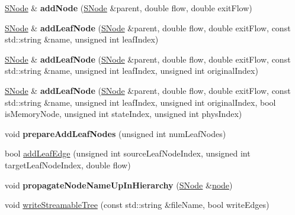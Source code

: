 \begin{DoxyCompactItemize}
\mbox{\hyperlink{classSNode}{S\+Node}} \& {\bfseries add\+Node} (\mbox{\hyperlink{classSNode}{S\+Node}} \&parent, double flow, double exit\+Flow)
\item 
\mbox{\label{classHierarchicalNetwork_a5aad30a822aacde199079cb03190194f}} 
\mbox{\hyperlink{classSNode}{S\+Node}} \& {\bfseries add\+Leaf\+Node} (\mbox{\hyperlink{classSNode}{S\+Node}} \&parent, double flow, double exit\+Flow, const std\+::string \&name, unsigned int leaf\+Index)
\item 
\mbox{\label{classHierarchicalNetwork_a276be851d34e1e2ffb1b12a314f9313a}} 
\mbox{\hyperlink{classSNode}{S\+Node}} \& {\bfseries add\+Leaf\+Node} (\mbox{\hyperlink{classSNode}{S\+Node}} \&parent, double flow, double exit\+Flow, const std\+::string \&name, unsigned int leaf\+Index, unsigned int original\+Index)
\item 
\mbox{\label{classHierarchicalNetwork_a1d9f53da720bd03750af0b747fd8eb70}} 
\mbox{\hyperlink{classSNode}{S\+Node}} \& {\bfseries add\+Leaf\+Node} (\mbox{\hyperlink{classSNode}{S\+Node}} \&parent, double flow, double exit\+Flow, const std\+::string \&name, unsigned int leaf\+Index, unsigned int original\+Index, bool is\+Memory\+Node, unsigned int state\+Index, unsigned int phys\+Index)
\item 
\mbox{\label{classHierarchicalNetwork_ad0a7ed5227bda931f77167acbaf89487}} 
void {\bfseries prepare\+Add\+Leaf\+Nodes} (unsigned int num\+Leaf\+Nodes)
\item 
bool \mbox{\hyperlink{classHierarchicalNetwork_afe1778c66f0b4444d70db38214b43ee1}{add\+Leaf\+Edge}} (unsigned int source\+Leaf\+Node\+Index, unsigned int target\+Leaf\+Node\+Index, double flow)
\item 
\mbox{\label{classHierarchicalNetwork_acb6954557f7096139cb377be986bc2a7}} 
void {\bfseries propagate\+Node\+Name\+Up\+In\+Hierarchy} (\mbox{\hyperlink{classSNode}{S\+Node}} \&\mbox{\hyperlink{structnode}{node}})
\item 
void \mbox{\hyperlink{classHierarchicalNetwork_af9dcdae2d598bdfd3af540a07e10b42f}{write\+Streamable\+Tree}} (const std\+::string \&file\+Name, bool write\+Edges)
\item 
\mbox{\label{classHierarchicalNetwork_adaeada9505974f4aa0c2445926dc4f31}} 

\end{DoxyCompactItemize}
